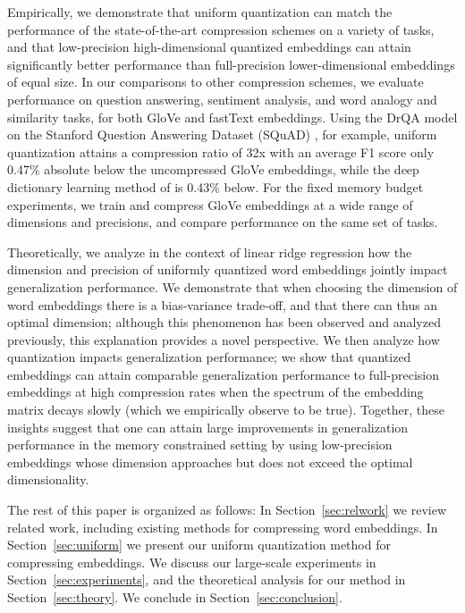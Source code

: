 Empirically, we demonstrate that uniform quantization can match the performance of the state-of-the-art compression schemes on a variety of tasks, and that low-precision high-dimensional quantized embeddings can attain significantly better performance than full-precision lower-dimensional embeddings of equal size.
In our comparisons to other compression schemes, we evaluate performance on question answering, sentiment analysis, and word analogy and similarity tasks, for both GloVe \citep{glove14} and fastText \citep{fasttext18} embeddings.
Using the DrQA model \citep{drqa17} on the Stanford Question Answering Dataset (SQuAD) \citep{squad16}, for example, uniform quantization attains a compression ratio of 32x with an average F1 score only 0.47\% absolute below the uncompressed GloVe embeddings, while the deep dictionary learning method of \citet{dccl17} is 0.43\% below.
For the fixed memory budget experiments, we train and compress GloVe embeddings at a wide range of dimensions and precisions, and compare performance on the same set of tasks.

Theoretically, we analyze in the context of linear ridge regression how the dimension and precision of uniformly quantized word embeddings jointly impact generalization performance.
We demonstrate that when choosing the dimension of word embeddings there is a bias-variance trade-off, and that there can thus an optimal dimension; although this phenomenon has been observed \citep{landauer97} and analyzed \citep{yin18} previously, this explanation provides a novel perspective.
We then analyze how quantization impacts generalization performance; we show that quantized embeddings can attain comparable generalization performance to full-precision embeddings at high compression rates when the spectrum of the embedding matrix decays slowly (which we empirically observe to be true).
Together, these insights suggest that one can attain large improvements in generalization performance in the memory constrained setting by using low-precision embeddings whose dimension approaches but does not exceed the optimal dimensionality.

The rest of this paper is organized as follows:
In Section~\ref{sec:relwork} we review related work, including existing methods for compressing word embeddings.
In Section~\ref{sec:uniform} we present our uniform quantization method for compressing embeddings.
We discuss our large-scale experiments in Section~\ref{sec:experiments}, and the theoretical analysis for our method in Section~\ref{sec:theory}.
We conclude in Section~\ref{sec:conclusion}.

